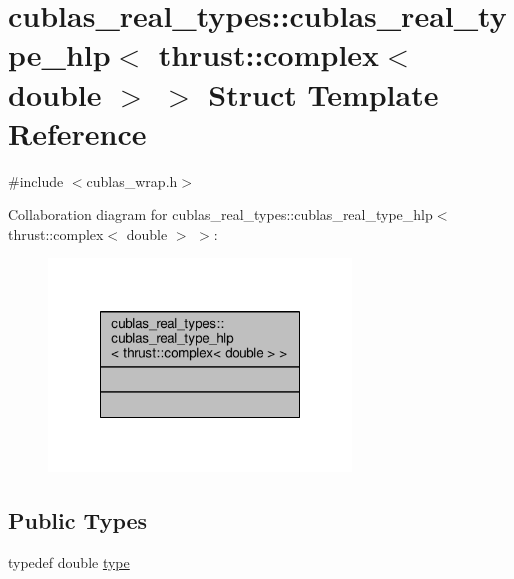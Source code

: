 \hypertarget{structcublas__real__types_1_1cublas__real__type__hlp_3_01thrust_1_1complex_3_01double_01_4_01_4}{\section{cublas\-\_\-real\-\_\-types\-:\-:cublas\-\_\-real\-\_\-type\-\_\-hlp$<$ thrust\-:\-:complex$<$ double $>$ $>$ Struct Template Reference}
\label{structcublas__real__types_1_1cublas__real__type__hlp_3_01thrust_1_1complex_3_01double_01_4_01_4}
}


{\ttfamily \#include $<$cublas\-\_\-wrap.\-h$>$}



Collaboration diagram for cublas\-\_\-real\-\_\-types\-:\-:cublas\-\_\-real\-\_\-type\-\_\-hlp$<$ thrust\-:\-:complex$<$ double $>$ $>$\-:
\nopagebreak
\begin{figure}[H]
\begin{center}
\leavevmode
\includegraphics[width=228pt]{structcublas__real__types_1_1cublas__real__type__hlp_3_01thrust_1_1complex_3_01double_01_4_01_4__coll__graph}
\end{center}
\end{figure}
\subsection*{Public Types}
\begin{DoxyCompactItemize}
\item 
typedef double \hyperlink{structcublas__real__types_1_1cublas__real__type__hlp_3_01thrust_1_1complex_3_01double_01_4_01_4_a3c16a6086c808ba1aab003acb23ad9fb}{type}
\end{DoxyCompactItemize}


